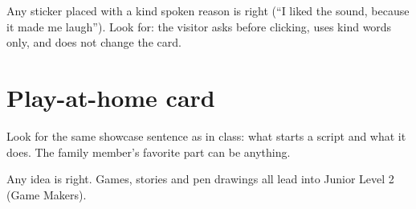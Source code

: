 \begin{answer}
Any sticker placed with a kind spoken reason is right (\enquote{I liked the sound, because it made me laugh}). Look for: the visitor asks before clicking, uses kind words only, and does not change the card.
\end{answer}

\section{Play-at-home card}
\begin{answer}
Look for the same showcase sentence as in class: what starts a script and what it does. The family member's favorite part can be anything.
\end{answer}

\begin{answer}
Any idea is right. Games, stories and pen drawings all lead into Junior Level 2 (Game Makers).
\end{answer}
